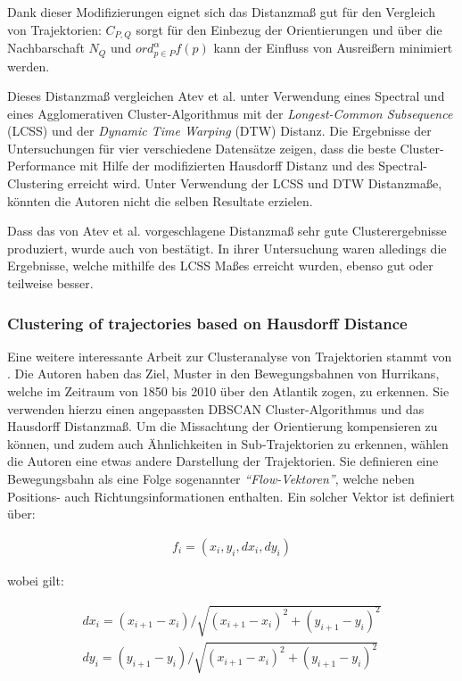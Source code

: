 Dank dieser Modifizierungen eignet sich das Distanzmaß gut für den Vergleich von Trajektorien:
$C_{P,Q}$ sorgt für den Einbezug der Orientierungen und über die Nachbarschaft $N_Q$ und $ord_{p \in P}^{\alpha} f(p)$
kann der Einfluss von Ausreißern minimiert werden.

Dieses Distanzmaß vergleichen Atev et al. unter Verwendung eines Spectral und eines Agglomerativen
Cluster-Algorithmus mit der \textit{Longest-Common Subsequence} (LCSS) und der \textit{Dynamic Time Warping} (DTW) Distanz.
Die Ergebnisse der Untersuchungen für vier verschiedene Datensätze zeigen, dass die beste Cluster-Performance
mit Hilfe der modifizierten Hausdorff Distanz und des Spectral-Clustering erreicht wird.
Unter Verwendung der LCSS und DTW Distanzmaße, könnten die Autoren nicht die selben Resultate erzielen.

Dass das von Atev et al. vorgeschlagene Distanzmaß sehr gute Clusterergebnisse produziert, wurde auch von \cite[]{Morris2009}
bestätigt. In ihrer Untersuchung waren alledings die Ergebnisse, welche mithilfe des LCSS Maßes erreicht wurden,
ebenso gut oder teilweise besser.

\subsubsection*{Clustering of trajectories based on Hausdorff Distance}
Eine weitere interessante Arbeit zur Clusteranalyse von Trajektorien stammt von \cite[]{Chen2011}.
Die Autoren haben das Ziel, Muster in den Bewegungsbahnen von Hurrikans, welche im Zeitraum von 1850 bis 2010
über den Atlantik zogen, zu erkennen.
Sie verwenden hierzu einen angepassten DBSCAN Cluster-Algorithmus und das Hausdorff Distanzmaß.
Um die Missachtung der Orientierung kompensieren zu können, und zudem auch Ähnlichkeiten
in Sub-Trajektorien zu erkennen, wählen die Autoren eine etwas andere Darstellung der Trajektorien.
Sie definieren eine Bewegungsbahn als eine Folge sogenannter \textit{``Flow-Vektoren''}, welche neben
Positions- auch Richtungsinformationen enthalten. Ein solcher Vektor ist definiert über:

\begin{ceqn}
\begin{align}
    f_i = (x_i, y_i, dx_i, dy_i)
\end{align}
\end{ceqn}

wobei gilt:

\begin{ceqn}
\begin{align}
    dx_i = (x_{i+1} - x_i)/\sqrt{(x_{i+1} - x_i)^2 + (y_{i+1} - y_i)^2} \\
    dy_i = (y_{i+1} - y_i)/\sqrt{(x_{i+1} - x_i)^2 + (y_{i+1} - y_i)^2}
\end{align}
\end{ceqn}

